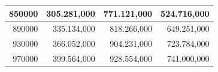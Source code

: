 \documentclass[a4paper, 12pt]{article}
\begin{document}
\begin{longtable}[c]{@{}rrrr@{}}
	\multicolumn{1}{|r|}{850000}                  & \multicolumn{1}{r|}{305.281,000}       & \multicolumn{1}{r|}{771.121,000}         & \multicolumn{1}{r|}{524.716,000}       \\* \midrule
	\multicolumn{1}{|r|}{890000}                  & \multicolumn{1}{r|}{335.134,000}       & \multicolumn{1}{r|}{818.266,000}         & \multicolumn{1}{r|}{649.251,000}       \\* \midrule
	\multicolumn{1}{|r|}{930000}                  & \multicolumn{1}{r|}{366.052,000}       & \multicolumn{1}{r|}{904.231,000}         & \multicolumn{1}{r|}{723.784,000}       \\* \midrule
	\multicolumn{1}{|r|}{970000}                  & \multicolumn{1}{r|}{399.564,000}       & \multicolumn{1}{r|}{928.554,000}         & \multicolumn{1}{r|}{741.000,000}       \\* \bottomrule
\end{longtable}
\end{document}
